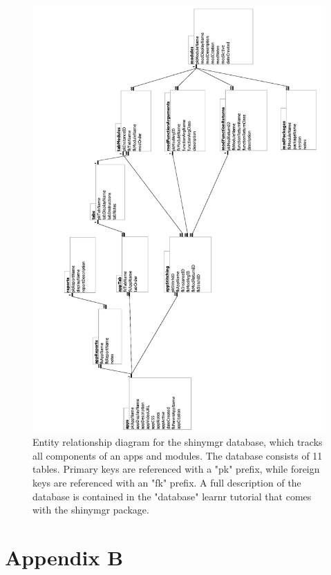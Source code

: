 \begin{figure}[h]
\includegraphics[width=0.85\linewidth]{images/figure8} \caption{Entity relationship diagram for the shinymgr database, which tracks all components of an apps and modules.  The database consists of 11 tables. Primary keys are referenced with a "pk" prefix, while foreign keys are referenced with an "fk" prefix. A full description of the database is contained in the "database" learnr tutorial that comes with the shinymgr package.}\label{fig:fig8}
\end{figure}

\newpage

\section{Appendix B}\label{appendix-b}

